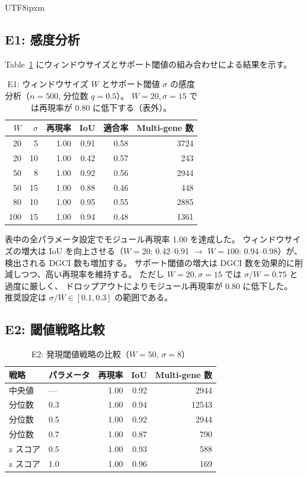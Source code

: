 \documentclass[11pt,a4paper]{article}
\begin{document}
\begin{CJK}{UTF8}{ipxm}
\subsection{E1: 感度分析}

Table~\ref{tab:sensitivity} にウィンドウサイズとサポート閾値の組み合わせによる結果を示す。

\begin{table}[t]
\centering
\caption{E1: ウィンドウサイズ $W$ とサポート閾値 $\sigma$ の感度分析（$n=500$, 分位数 $q=0.5$）。
$W=20, \sigma=15$ では再現率が 0.80 に低下する（表外）。}
\label{tab:sensitivity}
\begin{tabular}{rr|rrr|r}
\toprule
$W$ & $\sigma$ & 再現率 & IoU & 適合率 & Multi-gene 数 \\
\midrule
20  &  5  & 1.00 & 0.91 & 0.58 & 3724 \\
20  & 10  & 1.00 & 0.42 & 0.57 &  243 \\
50  &  8  & 1.00 & 0.92 & 0.56 & 2944 \\
50  & 15  & 1.00 & 0.88 & 0.46 &  448 \\
80  & 10  & 1.00 & 0.95 & 0.55 & 2885 \\
100 & 15  & 1.00 & 0.94 & 0.48 & 1361 \\
\bottomrule
\end{tabular}
\end{table}

表中の全パラメータ設定でモジュール再現率 1.00 を達成した。
ウィンドウサイズの増大は IoU を向上させる（$W=20$: 0.42--0.91 $\to$ $W=100$: 0.94--0.98）が、
検出される DGCI 数も増加する。
サポート閾値の増大は DGCI 数を効果的に削減しつつ、高い再現率を維持する。
ただし $W=20, \sigma=15$ では $\sigma/W = 0.75$ と過度に厳しく、
ドロップアウトによりモジュール再現率が 0.80 に低下した。
推奨設定は $\sigma / W \in [0.1, 0.3]$ の範囲である。

\subsection{E2: 閾値戦略比較}

\begin{table}[t]
\centering
\caption{E2: 発現閾値戦略の比較（$W=50$, $\sigma=8$）}
\label{tab:threshold}
\begin{tabular}{ll|rrr}
\toprule
戦略 & パラメータ & 再現率 & IoU & Multi-gene 数 \\
\midrule
中央値    & ---  & 1.00 & 0.92 & 2944 \\
分位数    & 0.3  & 1.00 & 0.94 & 12543 \\
分位数    & 0.5  & 1.00 & 0.92 & 2944 \\
分位数    & 0.7  & 1.00 & 0.87 & 790 \\
z スコア  & 0.5  & 1.00 & 0.93 & 588 \\
z スコア  & 1.0  & 1.00 & 0.96 & 169 \\
\bottomrule
\end{tabular}
\end{table}


\end{CJK}
\end{document}
